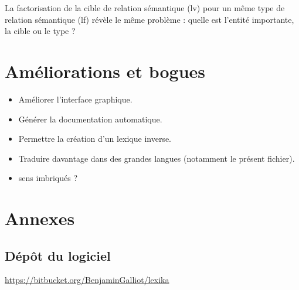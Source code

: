 \documentclass[10pt]{report}
\begin{document}
\bigskip

La factorisation de la cible de relation sémantique (lv) pour un même type de relation sémantique (lf) révèle le même problème : quelle est l’entité importante, la cible ou le type ?


\chapter{Améliorations et bogues}

\begin{itemize}
    \item Améliorer l’interface graphique.
    \item Générer la documentation automatique.
    \item Permettre la création d’un lexique inverse.
    \item Traduire davantage dans des grandes langues (notamment le présent fichier).
    \item sens imbriqués ?
\end{itemize}

\chapter{Annexes}

\section{Dépôt du logiciel}

\url{https://bitbucket.org/BenjaminGalliot/lexika}
\end{document}
